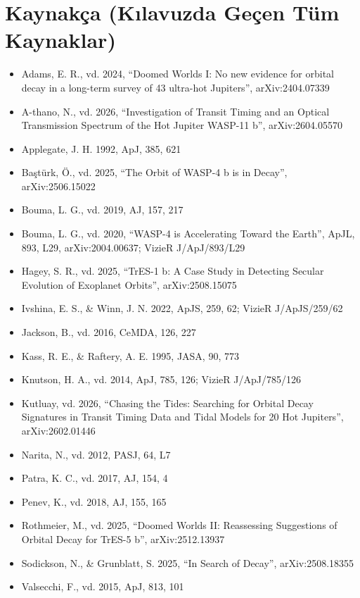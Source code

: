 \section*{Kaynakça (Kılavuzda Geçen Tüm Kaynaklar)}
\begin{small}
\begin{itemize}[leftmargin=*,itemsep=0.1em]
\item Adams, E. R., vd. 2024, “Doomed Worlds I: No new evidence for orbital decay in a long-term survey of 43 ultra-hot Jupiters”, arXiv:2404.07339
\item A-thano, N., vd. 2026, “Investigation of Transit Timing and an Optical Transmission Spectrum of the Hot Jupiter WASP-11 b”, arXiv:2604.05570
\item Applegate, J. H. 1992, ApJ, 385, 621
\item Baştürk, Ö., vd. 2025, “The Orbit of WASP-4 b is in Decay”, arXiv:2506.15022
\item Bouma, L. G., vd. 2019, AJ, 157, 217
\item Bouma, L. G., vd. 2020, “WASP-4 is Accelerating Toward the Earth”, ApJL, 893, L29, arXiv:2004.00637; VizieR J/ApJ/893/L29
\item Hagey, S. R., vd. 2025, “TrES-1 b: A Case Study in Detecting Secular Evolution of Exoplanet Orbits”, arXiv:2508.15075
\item Ivshina, E. S., \& Winn, J. N. 2022, ApJS, 259, 62; VizieR J/ApJS/259/62
\item Jackson, B., vd. 2016, CeMDA, 126, 227
\item Kass, R. E., \& Raftery, A. E. 1995, JASA, 90, 773
\item Knutson, H. A., vd. 2014, ApJ, 785, 126; VizieR J/ApJ/785/126
\item Kutluay, vd. 2026, “Chasing the Tides: Searching for Orbital Decay Signatures in Transit Timing Data and Tidal Models for 20 Hot Jupiters”, arXiv:2602.01446
\item Narita, N., vd. 2012, PASJ, 64, L7
\item Patra, K. C., vd. 2017, AJ, 154, 4
\item Penev, K., vd. 2018, AJ, 155, 165
\item Rothmeier, M., vd. 2025, “Doomed Worlds II: Reassessing Suggestions of Orbital Decay for TrES-5 b”, arXiv:2512.13937
\item Sodickson, N., \& Grunblatt, S. 2025, “In Search of Decay”, arXiv:2508.18355
\item Valsecchi, F., vd. 2015, ApJ, 813, 101

\end{itemize}
\end{small}
